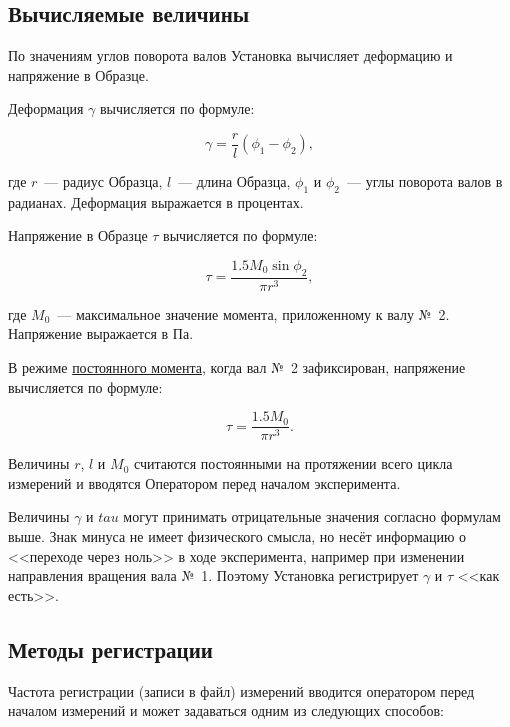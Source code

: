 \documentclass[12pt, a4paper, twocolumn]{report}
\begin{document}
\subsection{Вычисляемые величины}

По значениям углов поворота валов Установка вычисляет деформацию и напряжение в Образце.

Деформация $\gamma$ вычисляется по формуле:

\begin{equation}
\label{eq_gamma}
\gamma = \frac{r}{l} \left( \phi_1 - \phi_2 \right),
\end{equation}

\noindent где $r$~--- радиус Образца, $l$~--- длина Образца, $\phi_1$ и $\phi_2$~--- углы поворота валов в радианах. Деформация выражается в процентах.

Напряжение в Образце $\tau$ вычисляется по формуле:

\begin{equation}
\label{eq_tau}
\tau = \frac{1.5 M_0 \sin \phi_2}{\pi r^3},
\end{equation}

\noindent где $M_0$~--- максимальное значение момента, приложенному к 
валу №~2. Напряжение выражается в Па.

В режиме \hyperref[sec_const_momentum]{постоянного момента}, когда вал №~2 зафиксирован, напряжение вычисляется по формуле:

\begin{equation}
\label{eq_tau}
\tau = \frac{1.5 M_0}{\pi r^3}.
\end{equation}

Величины $r$, $l$ и $M_0$ считаются постоянными на протяжении всего цикла измерений и вводятся Оператором перед началом эксперимента.

Величины $\gamma$ и $tau$ могут принимать отрицательные значения согласно формулам выше. Знак минуса не имеет физического смысла, но несёт информацию о <<переходе через ноль>> в ходе эксперимента, например при изменении направления вращения вала №~1. Поэтому Установка регистрирует $\gamma$ и $\tau$ <<как есть>>.

\subsection{Методы регистрации}

\label{sec_registration_types}

Частота регистрации (записи в файл) измерений вводится оператором перед началом измерений и может задаваться одним из следующих способов:
\end{document}
